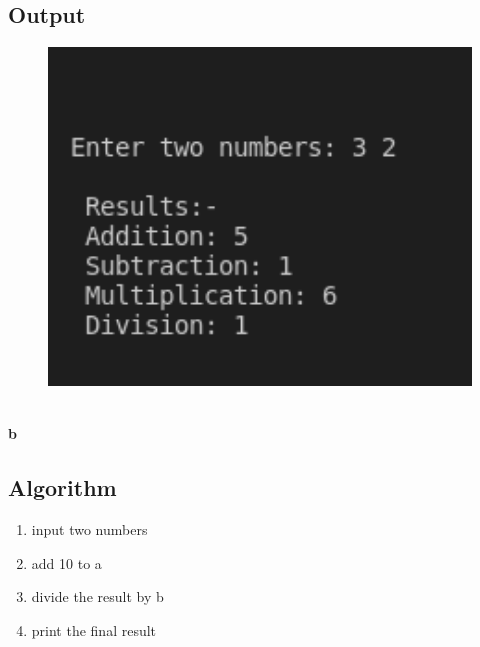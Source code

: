\documentclass[12pt]{article}
\begin{document}
\subsection{Output}
\begin{figure}[h]
    \centering
    \includegraphics[width=1.0\textwidth]{4a.png}
\end{figure}\\ \newline
\newpage
\textbf{b}
\subsection{Algorithm}
\begin{enumerate}
    \item input two numbers
    \item add 10 to a
    \item divide the result by b
    \item print the final result
\end{enumerate}
\end{document}
